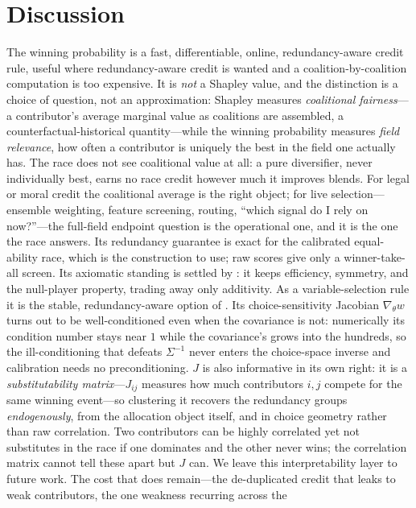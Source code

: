 \documentclass[11pt]{article}
\begin{document}
\section{Discussion}
\label{sec:discussion}

The winning probability is a fast, differentiable, online, redundancy-aware credit
rule, useful where redundancy-aware credit is wanted and a coalition-by-coalition
computation is too expensive. It is \emph{not} a Shapley value, and the distinction is
a choice of question, not an approximation: Shapley measures \emph{coalitional
fairness}---a contributor's average marginal value as coalitions are assembled, a
counterfactual-historical quantity---while the winning probability measures
\emph{field relevance}, how often a contributor is uniquely the best in the field one
actually has. The race does not see coalitional value at all: a pure diversifier,
never individually best, earns no race credit however much it improves blends. For legal or moral
credit the coalitional average is the right object; for live selection---ensemble
weighting, feature screening, routing, ``which signal do I rely on now?''---the
full-field endpoint question is the operational one, and it is the one the race
answers. Its redundancy guarantee is exact for the calibrated equal-ability
race, which is the construction to use; raw scores give only a winner-take-all
screen. Its axiomatic standing is settled by : it keeps
efficiency, symmetry, and the null-player property, trading away only additivity.
As a variable-selection rule it is the stable, redundancy-aware option of
. Its choice-sensitivity Jacobian $\nabla_\theta w$ turns out to be
well-conditioned even when the covariance is not: numerically its condition number
stays near $1$ while the covariance's grows into the hundreds, so the
ill-conditioning that defeats $\Sigma^{-1}$ never enters the choice-space inverse and
calibration needs no preconditioning. $J$ is also informative in its own right: it is
a \emph{substitutability matrix}---$J_{ij}$ measures how much contributors $i,j$
compete for the same winning event---so clustering it recovers the redundancy groups
\emph{endogenously}, from the allocation object itself, and in choice geometry rather
than raw correlation. Two contributors can be highly correlated yet not substitutes
in the race if one dominates and the other never wins; the correlation matrix cannot
tell these apart but $J$ can. We leave this interpretability layer to future work. The cost that does remain---the de-duplicated
credit that leaks to weak contributors, the one weakness recurring across the
\end{document}
